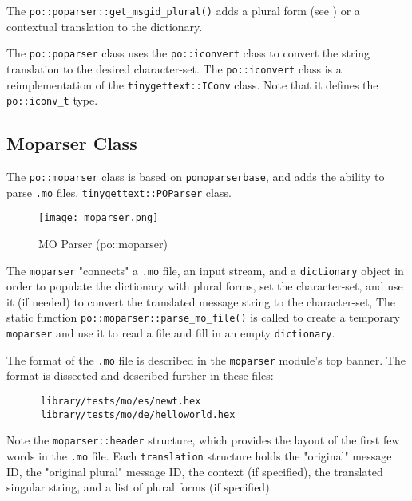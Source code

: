    The \texttt{po::poparser::get\_msgid\_plural()} adds a plural form
   (see )
   or a contextual translation to the dictionary.


   The \texttt{po::poparser} class uses the \texttt{po::iconvert} class
   to convert the string translation to the desired character-set.
   The \texttt{po::iconvert} class is a reimplementation of the
   \texttt{tinygettext::IConv} class.
   Note that it defines the \texttt{po::iconv\_t} type.

\subsection{Moparser Class}
\label{subsec:potext_moparser_class}

   The \texttt{po::moparser} class is based on \texttt{pomoparserbase},
   and adds the ability to parse \texttt{.mo} files.
   \texttt{tinygettext::POParser} class.

\begin{figure}[H]
   \centering 
   \texttt{[image: moparser.png]}
   \caption{MO Parser (po::moparser)}
   \label{fig:potext_moparser}
\end{figure}

   The \texttt{moparser} "connects" a \texttt{.mo} file, an input stream,
   and a \texttt{dictionary} object in order to populate the dictionary with
   plural forms, set the character-set, and use it (if needed) to convert the
   translated message string to the character-set,
   The static function \texttt{po::moparser::parse\_mo\_file()} is called to
   create a temporary \texttt{moparser} and use it to
   read a file and fill in an empty \texttt{dictionary}.

   The format of the \texttt{.mo} file is described in the \texttt{moparser}
   module's top banner. The format is dissected and described further in these
   files:

   \begin{verbatim}
      library/tests/mo/es/newt.hex
      library/tests/mo/de/helloworld.hex
   \end{verbatim}

   Note the \texttt{moparser::header} structure, which provides
   the layout of the first few words in the \texttt{.mo} file.
   Each \texttt{translation} structure holds the "original" message ID,
   the "original plural" message ID, the context (if specified),
   the translated singular string, and a list of plural forms (if specified).


